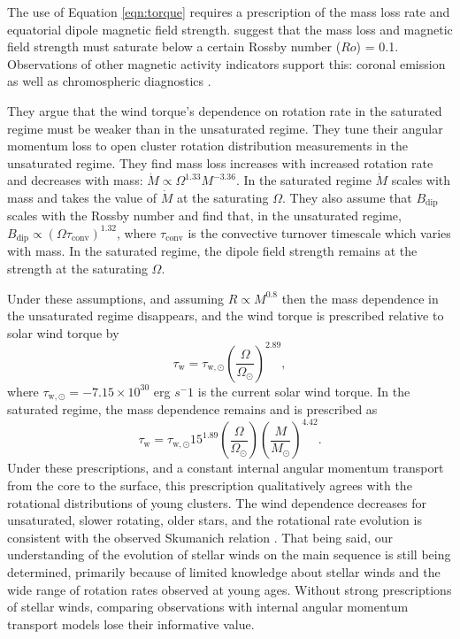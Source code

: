 The use of Equation \ref{eqn:torque} requires a prescription of the mass loss rate and equatorial dipole magnetic field strength.
\citet{matt_magnetic_2012, gallet_improved_2013, johnstone_stellar_2015} suggest that the mass loss and magnetic field strength must saturate below a certain Rossby number ($Ro$) = 0.1.
Observations of other magnetic activity indicators support this: coronal emission \citep{pizzolato_stellar_2003, wright_stellar-activity-rotation_2011,nunez_factory_2022} as well
as chromospheric diagnostics \citep{soderblom_rotation_1993,fang_stellar_2018, fritzewski_detailed_2021}.

They argue that the wind torque's dependence on rotation rate in the saturated regime must be weaker than in the unsaturated regime.
They tune their angular momentum loss to open cluster rotation distribution measurements in the unsaturated regime.
They find mass loss increases with increased rotation rate and decreases with mass: $\Dot{M} \propto \Omega^{1.33} M^{-3.36}$.
In the saturated regime $\Dot{M}$ scales with mass and takes the value of $\Dot{M}$ at the saturating $\Omega$.
They also assume that $B_{\text{dip}}$ scales with the Rossby number and find that, in the unsaturated regime, $B_{\text{dip}} \propto \left(\Omega \tau_{\text{conv}}\right)^{1.32}$, where $\tau_{\text{conv}}$ is the convective turnover timescale which varies with mass.
In the saturated regime, the dipole field strength remains at the strength at the saturating $\Omega$.

Under these assumptions, and assuming $R \propto M^{0.8}$ then the mass dependence in the unsaturated regime disappears, and the wind torque is prescribed relative to solar wind torque by
\begin{equation}
    \tau_{\text{w}} = \tau_{\text{w},\odot} \left(\frac {\Omega}{\Omega_{\odot}} \right)^{2.89},
\end{equation}
where $\tau_{\text{w},\odot} = -7.15 \times 10^{30}$ erg $s^-1$ is the current solar wind torque.
In the saturated regime, the mass dependence remains and is prescribed as
\begin{equation}
    \tau_{\text{w}} = \tau_{\text{w},\odot} 15^{1.89} \left(\frac{\Omega}{\Omega_{\odot}} \right) \left( \frac{M}{M_{\odot}} \right)^{4.42}.
\end{equation}
Under these prescriptions, and a constant internal angular momentum transport from the core to the surface, this prescription qualitatively agrees with the rotational distributions of young clusters.
The wind dependence decreases for unsaturated, slower rotating, older stars, and the rotational rate evolution is consistent with the observed Skumanich relation \citep{skumanich_time_1972}.
That being said, our understanding of the evolution of stellar winds on the main sequence is still being determined, primarily because of limited knowledge about stellar winds and the wide range of rotation rates observed at young ages.
Without strong prescriptions of stellar winds, comparing observations with internal angular momentum transport models lose their informative value.

